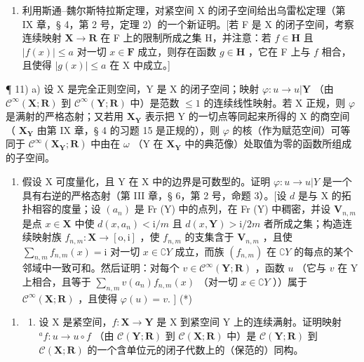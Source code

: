 \begin{enumerate}
\def\labelenumi{\arabic{enumi})}
\setcounter{enumi}{9}
\tightlist
\item
  利用斯通–魏尔斯特拉斯定理，对紧空间 X 的闭子空间给出乌雷松定理（第 IX 章，§ 4，第 2 号，定理 2）的一个新证明。{[}若 F 是 X 的闭子空间，考察连续映射 \(\mathbf{X} \to \mathbf{R}\) 在 F 上的限制所成之集 H，并注意：若 \(f \in \mathbf{H}\) 且 \(|f(x)| \leqslant a\) 对一切 \(x \in \mathbf{F}\) 成立，则存在函数 \(g \in \mathbf{H}\) ，它在 F 上与 \(f\) 相合，且使得 \(|g(x)| \leqslant a\) 在 X 中成立。{]}
\end{enumerate}

¶ 11) a) 设 X 是完全正则空间，Y 是 X 的闭子空间；映射 \(\varphi: u \to u|\mathbf{Y}\) （由 \(\mathcal{C}^{\infty}(\mathbf{X}; \mathbf{R})\) 到 \(\mathcal{C}^{\infty}(\mathbf{Y}; \mathbf{R})\) 中）是范数 \(\leqslant 1\) 的连续线性映射。若 X 正规，则 \(\varphi\) 是满射的严格态射；又若用 \(\mathbf{X}_{\mathbf{Y}}\) 表示把 Y 的一切点等同起来所得的 X 的商空间（ \(\mathbf{X}_{\mathbf{Y}}\) 由第 IX 章，§ 4 的习题 15 是正规的），则 \(\varphi\) 的核（作为赋范空间）可等同于 \(\mathcal{C}^{\infty}(\mathbf{X}_{\mathbf{Y}}; \mathbf{R})\) 中由在 \(\omega\) （Y 在 \(\mathbf{X}_{\mathbf{Y}}\) 中的典范像）处取值为零的函数所组成的子空间。

\begin{enumerate}
\def\labelenumi{\alph{enumi})}
\setcounter{enumi}{1}
\tightlist
\item
  假设 X 可度量化，且 Y 在 X 中的边界是可数型的。证明 \(\varphi: u \to u|Y\) 是一个具有右逆的严格态射（第 III 章，§ 6，第 2 号，命题 3）。{[}设 \(d\) 是与 X 的拓扑相容的度量；设 \((a_n)\) 是 Fr (Y) 中的点列，在 Fr (Y) 中稠密，并设 \(\mathbf{V}_{n,m}\) 是点 \(x \in \mathbf{X}\) 中使 \(d(x, a_n) < \mathrm{i}/m\) 且 \(d(x, \mathbf{Y}) > \mathrm{i}/2m\) 者所成之集；构造连续映射族 \(f_{n,m}: \mathbf{X} \to [\mathrm{o}, \mathrm{i}]\) ，使 \(f_{n,m}\) 的支集含于 \(\mathbf{V}_{n,m}\) ，且使 \(\sum_{n,m} f_{n,m}(x) = \mathrm{i}\) 对一切 \(x \in \complement Y\) 成立，而族 \((f_{n,m})\) 在 \(\complement Y\) 的每点的某个邻域中一致可和。然后证明：对每个 \(v \in \mathcal{C}^\infty(\mathbf{Y}; \mathbf{R})\) ，函数 \(u\) （它与 \(v\) 在 Y 上相合，且等于 \(\sum_{n,m} v(a_n) f_{n,m}(x)\) （对一切 \(x \in \complement Y\) ））属于 \(\mathcal{C}^\infty(\mathbf{X}; \mathbf{R})\) ，且使得 \(\varphi(u) = v.\) {]} (*)
\end{enumerate}

\begin{enumerate}
\def\labelenumi{\arabic{enumi})}
\setcounter{enumi}{11}
\tightlist
\item
  \begin{enumerate}
  \def\labelenumii{\alph{enumii})}
  \tightlist
  \item
    设 X 是紧空间，\(f: \mathbf{X} \to \mathbf{Y}\) 是 X 到紧空间 Y 上的连续满射。证明映射 \(^{a}f: u \to u \circ f\) （由 \(\mathcal{C}(\mathbf{Y}; \mathbf{R})\) 到 \(\mathcal{C}(\mathbf{X}; \mathbf{R})\) 中）是 \(\mathcal{C}(\mathbf{Y}; \mathbf{R})\) 到 \(\mathcal{C}(\mathbf{X}; \mathbf{R})\) 的一个含单位元的闭子代数上的（保范的）同构。
  \end{enumerate}
\end{enumerate}

